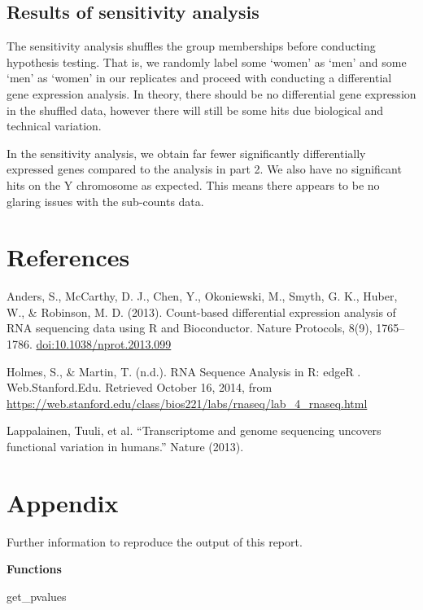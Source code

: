 \documentclass[]{article}
\newenvironment{Shaded}{\begin{snugshade}}{\end{snugshade}}
\newcommand{\NormalTok}[1]{{#1}}
\begin{document}
\subsection{Results of sensitivity
analysis}\label{results-of-sensitivity-analysis}

The sensitivity analysis shuffles the group memberships before
conducting hypothesis testing. That is, we randomly label some `women'
as `men' and some `men' as `women' in our replicates and proceed with
conducting a differential gene expression analysis. In theory, there
should be no differential gene expression in the shuffled data, however
there will still be some hits due biological and technical variation.

In the sensitivity analysis, we obtain far fewer significantly
differentially expressed genes compared to the analysis in part 2. We
also have no significant hits on the Y chromosome as expected. This
means there appears to be no glaring issues with the sub-counts data.

\section{References}\label{references}

Anders, S., McCarthy, D. J., Chen, Y., Okoniewski, M., Smyth, G. K.,
Huber, W., \& Robinson, M. D. (2013). Count-based differential
expression analysis of RNA sequencing data using R and Bioconductor.
Nature Protocols, 8(9), 1765--1786. \url{doi:10.1038/nprot.2013.099}

Holmes, S., \& Martin, T. (n.d.). RNA Sequence Analysis in R: edgeR .
Web.Stanford.Edu. Retrieved October 16, 2014, from
\url{https://web.stanford.edu/class/bios221/labs/rnaseq/lab_4_rnaseq.html}

Lappalainen, Tuuli, et al. ``Transcriptome and genome sequencing
uncovers functional variation in humans.'' Nature (2013).

\section{Appendix}\label{appendix}

Further information to reproduce the output of this report.

\textbf{Functions}

\begin{Shaded}
\begin{Highlighting}[]
\NormalTok{get_pvalues}
\end{Highlighting}
\end{Shaded}
\end{document}
